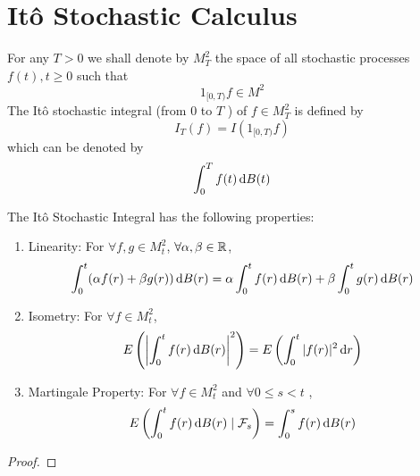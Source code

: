 \section{It\^o Stochastic Calculus}

\begin{definition}
	For any $T>0$ we shall denote by $M_{T}^{2}$ the space of all stochastic processes $f(t), t \geq 0$ such that
	\begin{equation*}
		1_{[0,T)}f\in M^{2}
	\end{equation*}
	The It\^o stochastic integral (from $0$ to $T$ ) of $f\in M_{T}^{2}$ is defined by
	\begin{equation}
		I_{T}(f)=I\left(1_{[0,T)}f\right)
	\end{equation}
	which can be denoted by
	\begin{equation}
		\int_{0}^{T}f(t)\mathop{}\!\mathrm{d} B(t)
	\end{equation}
\end{definition}

\begin{property}
	The It\^o Stochastic Integral has the following properties:
	\begin{enumerate}
		\item Linearity: For $\forall f,g\in M_{t}^{2}$, $\forall \alpha,\beta\in{\mathbb R}$,
		      \begin{equation}
			      \int_{0}^{t}(\alpha f(r)+\beta g(r))\mathop{}\!\mathrm{d} B(r)=\alpha \int_{0}^{t}f(r)\mathop{}\!\mathrm{d} B(r)+\beta\int_{0}^{t}g(r)\mathop{}\!\mathrm{d} B(r)
		      \end{equation}
		\item Isometry: For $\forall f\in M_{t}^{2}$,
		      \begin{equation}
			      E\left(\left|\int_{0}^{t}f(r)\mathop{}\!\mathrm{d} B(r)\right|^{2}\right)=E\left(\int_{0}^{t}|f(r)|^{2}\mathop{}\!\mathrm{d} r\right)
		      \end{equation}
		\item Martingale Property: For $\forall f\in M_{t}^{2}$ and  $\forall 0\leq s<t$ ,
		      \begin{equation}
			      E\left(\int_{0}^{t}f(r)\mathop{}\!\mathrm{d} B(r)\mid{\mathcal F}_{s}\right)=\int_{0}^{s}f(r)\mathop{}\!\mathrm{d} B(r)
		      \end{equation}
	\end{enumerate}
\end{property}

\begin{proof}

\end{proof}

